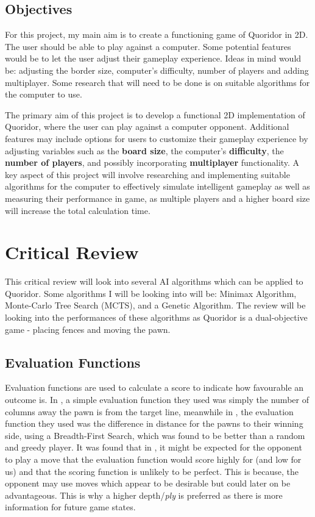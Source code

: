 \documentclass[review]{cmpreport}
\begin{document}
\subsection{Objectives}
For this project, my main aim is to create a functioning game of Quoridor in 2D. The user should be able to play against a computer. Some potential features would be to let the user adjust their gameplay experience. Ideas in mind would be: adjusting the border size, computer's difficulty, number of players and adding multiplayer. Some research that will need to be done is on suitable algorithms for the computer to use.\newline

\noindent The primary aim of this project is to develop a functional 2D implementation of Quoridor, where the user can play against a computer opponent. Additional features may include options for users to customize their gameplay experience by adjusting variables such as the \textbf{board size}, the computer's \textbf{difficulty}, the \textbf{number of players}, and possibly incorporating \textbf{multiplayer} functionality. A key aspect of this project will involve researching and implementing suitable algorithms for the computer to effectively simulate intelligent gameplay as well as measuring their performance in game, as multiple players and a higher board size will increase the total calculation time.

\section{Critical Review}
This critical review will look into several AI algorithms which can be applied to Quoridor. Some algorithms I will be looking into will be: Minimax Algorithm, Monte-Carlo Tree Search (MCTS), and a Genetic Algorithm. The review will be looking into the performances of these algorithms as Quoridor is a dual-objective game - placing fences and moving the pawn.

\subsection{Evaluation Functions}
Evaluation functions are used to calculate a score to indicate how favourable an outcome is. In \cite{mertens2006quoridor}, a simple evaluation function they used was simply the number of columns away the pawn is from the target line, meanwhile in \cite{josequoridor}, the evaluation function they used was the difference in distance for the pawns to their winning side, using a Breadth-First Search, which was found to be better than a random and greedy player. It was found that in \cite{strong2011minimax}, it might be expected for the opponent to play a move that the evaluation function would score highly for (and low for us) and that the scoring function is unlikely to be perfect. This is because, the opponent may use moves which appear to be desirable but could later on be advantageous. This is why a higher depth/\textit{ply} is preferred as there is more information for future game states.
\end{document}
